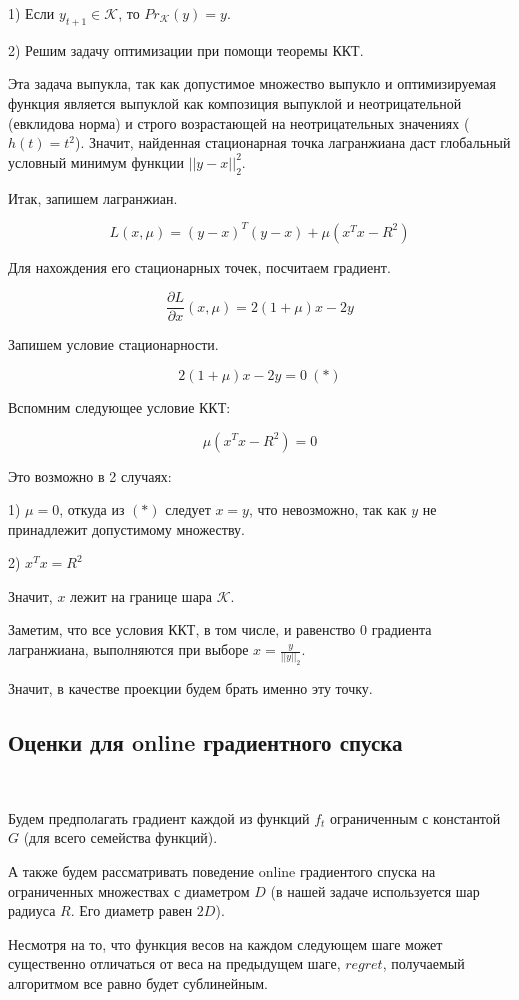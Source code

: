 \documentclass[12pt]{article}
\theoremstyle{definition}
\begin{document}
1) Если $y_{t+1} \in \mathcal{K}$, то $Pr_{\mathcal{K}}(y) = y$.

2) Решим задачу оптимизации при помощи теоремы ККТ.

	Эта задача выпукла, так как допустимое множество выпукло и оптимизируемая функция является выпуклой как композиция выпуклой и неотрицательной (евклидова норма) и строго возрастающей на неотрицательных значениях ($h(t) = t^2$).
	Значит, найденная стационарная точка лагранжиана даст глобальный условный минимум функции $||y-x||_2^2$.
	
	Итак, запишем лагранжиан.
	
	$$L(x, \mu) = (y-x)^T(y-x) + \mu(x^Tx - R^2)$$	
	
	Для нахождения его стационарных точек, посчитаем градиент.
	
	$$\frac{\partial L}{\partial x}(x, \mu) = 2(1+\mu)x - 2y$$
	
Запишем условие	стационарности.
	
	$$2(1+\mu)x - 2y = 0\ (*)$$ 
	
	Вспомним следующее условие ККТ:
	
	$$\mu(x^Tx-R^2) = 0$$
	
	Это возможно в 2 случаях:
	
	1) $\mu = 0$, откуда из $(*)$ следует $x=y$, что невозможно, так как $y$ не принадлежит допустимому множеству.
	
	2) $x^Tx = R^2$
	
	Значит, $x$ лежит на границе шара $\mathcal{K}$.
	
	Заметим, что все условия ККТ, в том числе, и равенство 0 градиента лагранжиана, выполняются при выборе $x = \frac{y}{||y||_2}$.
	
	Значит, в качестве проекции будем брать именно эту точку.

\subsection{Оценки для online градиентного спуска}
$ $

Будем предполагать градиент каждой из функций $f_t$ ограниченным с константой $G$ (для всего семейства функций).

А также будем рассматривать поведение online градиентого спуска на ограниченных множествах с диаметром $D$ (в нашей задаче используется шар радиуса $R$. Его диаметр равен $2D$).

Несмотря на то, что функция весов на каждом следующем шаге может существенно отличаться от веса на предыдущем шаге, $regret$, получаемый алгоритмом все равно будет сублинейным.
\end{document}
